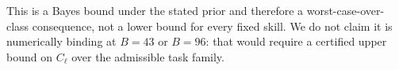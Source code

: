\documentclass[letterpaper,twocolumn,10pt]{article}
\begin{document}
This is a Bayes bound under the stated prior and therefore a worst-case-over-class
consequence, not a lower bound for every fixed skill.  We do not claim it is
numerically binding at $B=43$ or $B=96$: that would require a certified upper
bound on $C_\ell$ over the admissible task family.

\makeatletter
\setlength{\@dblfptop}{0pt}
\setlength{\@dblfpsep}{12pt}
\setlength{\@dblfpbot}{0pt plus 1fil}
\makeatother

\newpage




\end{document}
